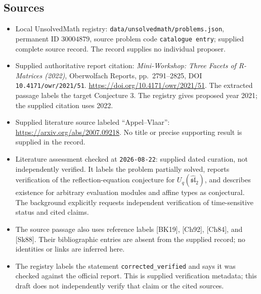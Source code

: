 \documentclass[11pt]{article}
\begin{document}
\subsection{Sources}
\begin{itemize}
\item Local UnsolvedMath registry: \texttt{data/unsolvedmath/problems.json}, permanent ID \(30004879\), source problem code \texttt{catalogue entry}; supplied complete source record. The record supplies no individual proposer.
\item Supplied authoritative report citation: \emph{Mini-Workshop: Three Facets of R-Matrices (2022)}, Oberwolfach Reports, pp.\ 2791--2825, DOI \texttt{10.4171/owr/2021/51}. \url{https://doi.org/10.4171/owr/2021/51}. The extracted passage labels the target Conjecture 3. The registry gives proposed year 2021; the supplied citation uses 2022.
\item Supplied literature source labeled ``Appel--Vlaar'': \url{https://arxiv.org/abs/2007.09218}. No title or precise supporting result is supplied in the record.
\item Literature assessment checked at \texttt{2026-08-22}: supplied dated curation, not independently verified. It labels the problem partially solved, reports verification of the reflection-equation conjecture for \(U_q(\widehat{\mathfrak{sl}}_2)\), and describes existence for arbitrary evaluation modules and affine types as conjectural. The background explicitly requests independent verification of time-sensitive status and cited claims.
\item The source passage also uses reference labels [BK19], [Ch92], [Ch84], and [Sk88]. Their bibliographic entries are absent from the supplied record; no identities or links are inferred here.
\item The registry labels the statement \texttt{corrected\_verified} and says it was checked against the official report. This is supplied verification metadata; this draft does not independently verify that claim or the cited sources.
\end{itemize}
\end{document}

